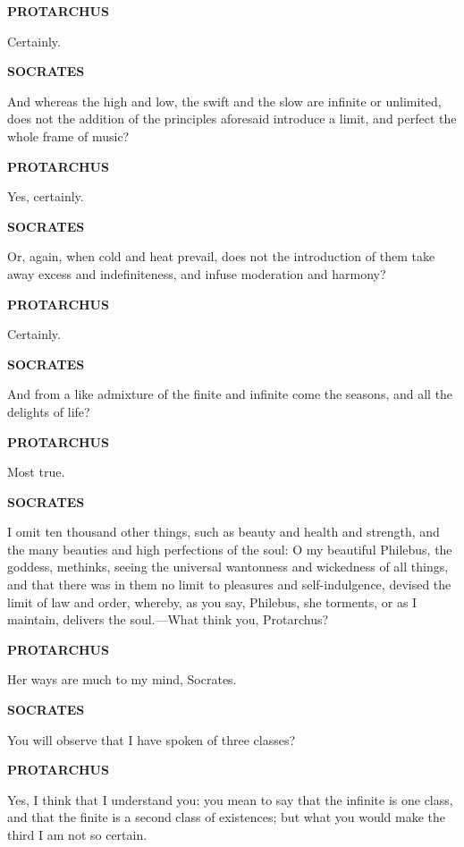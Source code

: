 \documentclass[11pt,letter]{article}
\begin{document}
\par \textbf{PROTARCHUS}
\par   Certainly.

\par \textbf{SOCRATES}
\par   And whereas the high and low, the swift and the slow are infinite or unlimited, does not the addition of the principles aforesaid introduce a limit, and perfect the whole frame of music?

\par \textbf{PROTARCHUS}
\par   Yes, certainly.

\par \textbf{SOCRATES}
\par   Or, again, when cold and heat prevail, does not the introduction of them take away excess and indefiniteness, and infuse moderation and harmony?

\par \textbf{PROTARCHUS}
\par   Certainly.

\par \textbf{SOCRATES}
\par   And from a like admixture of the finite and infinite come the seasons, and all the delights of life?

\par \textbf{PROTARCHUS}
\par   Most true.

\par \textbf{SOCRATES}
\par   I omit ten thousand other things, such as beauty and health and strength, and the many beauties and high perfections of the soul:  O my beautiful Philebus, the goddess, methinks, seeing the universal wantonness and wickedness of all things, and that there was in them no limit to pleasures and self-indulgence, devised the limit of law and order, whereby, as you say, Philebus, she torments, or as I maintain, delivers the soul.—What think you, Protarchus?

\par \textbf{PROTARCHUS}
\par   Her ways are much to my mind, Socrates.

\par \textbf{SOCRATES}
\par   You will observe that I have spoken of three classes?

\par \textbf{PROTARCHUS}
\par   Yes, I think that I understand you:  you mean to say that the infinite is one class, and that the finite is a second class of existences; but what you would make the third I am not so certain.
\end{document}
